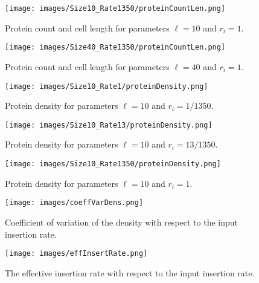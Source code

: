 \begin{figure}
\centering
\texttt{[image: images/Size10\_Rate1350/proteinCountLen.png]}
\caption{Protein count and cell length for parameters $\ell=10$ and $r_i=1$.
}
\label{fig:large-protein-number_cell-length_small}
\end{figure}
\begin{figure}
\centering
\texttt{[image: images/Size40\_Rate1350/proteinCountLen.png]}
\caption{Protein count and cell length for parameters $\ell=40$ and $r_i=1$.
}
\label{fig:large-protein-number_cell-length_large}
\end{figure}

\begin{figure}
\centering
\texttt{[image: images/Size10\_Rate1/proteinDensity.png]}
\caption{Protein density for parameters $\ell=10$ and $r_i=1/1350$.
}
\label{fig:small-density_length-small}
\end{figure}
\begin{figure}
\centering
\texttt{[image: images/Size10\_Rate13/proteinDensity.png]}
\caption{Protein density for parameters $\ell=10$ and $r_i=13/1350$.
}
\label{fig:medium-density_length-small}
\end{figure}
\begin{figure}
\centering
\texttt{[image: images/Size10\_Rate1350/proteinDensity.png]}
\caption{Protein density for parameters $\ell=10$ and $r_i=1$.
}
\label{fig:large-density_length-small}
\end{figure}



\begin{figure}
\centering
\texttt{[image: images/coeffVarDens.png]}
\caption{Coefficient of variation of the density with respect to the input insertion rate.
}
\label{fig:coeff_var}
\end{figure}
\begin{figure}
\centering
\texttt{[image: images/effInsertRate.png]}
\caption{The effective insertion rate with respect to the input insertion rate.
}
\label{fig:eff_insertion_rate}
\end{figure}